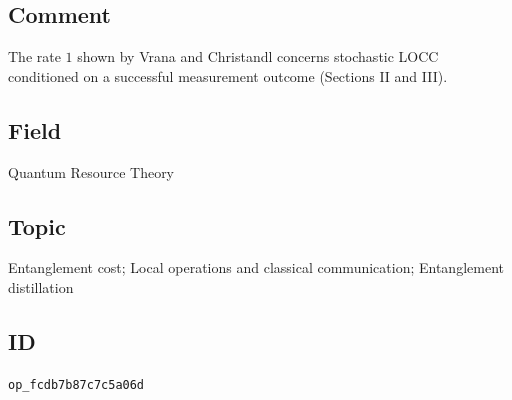\subsection*{Comment}

The rate $1$ shown by Vrana and Christandl concerns stochastic LOCC conditioned on a successful measurement outcome  (Sections II and III).

\subsection*{Field}

Quantum Resource Theory

\subsection*{Topic}

Entanglement cost; Local operations and classical communication; Entanglement distillation

\subsection*{ID}

\texttt{op\_fcdb7b87c7c5a06d}
